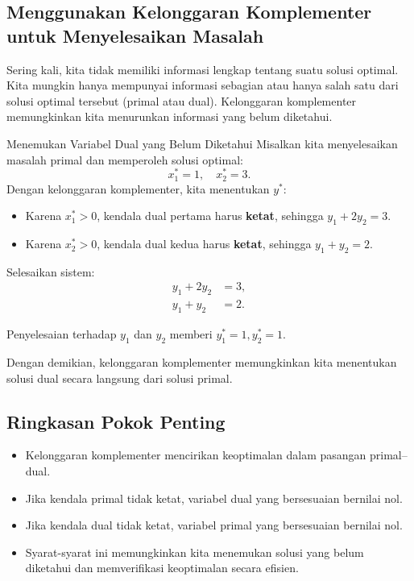 \subsection{Menggunakan Kelonggaran Komplementer untuk Menyelesaikan Masalah}
\label{sec:cs-solving}
Sering kali, kita tidak memiliki informasi lengkap tentang suatu solusi optimal. Kita mungkin hanya mempunyai informasi sebagian atau hanya salah satu dari solusi optimal tersebut (primal atau dual). Kelonggaran komplementer memungkinkan kita menurunkan informasi yang belum diketahui.

\begin{example}{Menemukan Variabel Dual yang Belum Diketahui}\label{example:cs-missing-duals}
Misalkan kita menyelesaikan masalah primal dan memperoleh solusi optimal:
\[
x_1^* = 1, \quad x_2^* = 3.
\]
Dengan kelonggaran komplementer, kita menentukan $y^*$:
\begin{itemize}
\item Karena $x_1^* > 0$, kendala dual pertama harus \textbf{ketat}, sehingga $y_1 + 2y_2 = 3$.
\item Karena $x_2^* > 0$, kendala dual kedua harus \textbf{ketat}, sehingga $y_1 + y_2 = 2$.
\end{itemize}

Selesaikan sistem:
\begin{align*}
   y_1 + 2y_2 &= 3, \\
   y_1 + y_2 &= 2.
\end{align*}

Penyelesaian terhadap $y_1$ dan $y_2$ memberi $y_1^* = 1, y_2^* = 1$.

Dengan demikian, kelonggaran komplementer memungkinkan kita menentukan solusi dual secara langsung dari solusi primal.
\end{example}

\subsection{Ringkasan Pokok Penting}
\begin{itemize}
\item Kelonggaran komplementer mencirikan keoptimalan dalam pasangan primal--dual.
\item Jika kendala primal tidak ketat, variabel dual yang bersesuaian bernilai nol.
\item Jika kendala dual tidak ketat, variabel primal yang bersesuaian bernilai nol.
\item Syarat-syarat ini memungkinkan kita menemukan solusi yang belum diketahui dan memverifikasi keoptimalan secara efisien.
\end{itemize}

